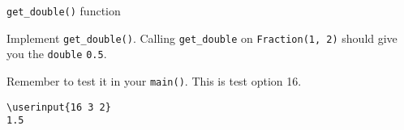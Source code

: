 \verb!get_double()! function

Implement \verb!get_double()!.
Calling \verb!get_double! on \verb!Fraction(1, 2)! should give you
the \verb!double! \verb!0.5!.

Remember to test it in your \verb!main()!.
This is test option 16.

\resett
\nextt
\begin{Verbatim}[frame=single, commandchars=\\\{\}]
\userinput{16 3 2}
1.5
\end{Verbatim}
